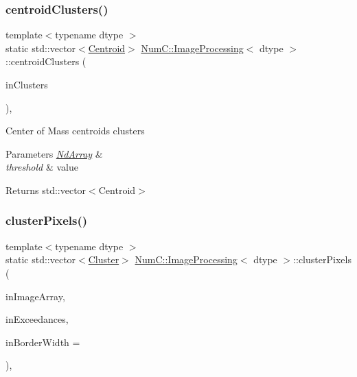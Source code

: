 \subsubsection{\texorpdfstring{centroid\+Clusters()}{centroidClusters()}}
{\footnotesize\ttfamily template$<$typename dtype $>$ \\
static std\+::vector$<$\mbox{\hyperlink{class_num_c_1_1_image_processing_1_1_centroid}{Centroid}}$>$ \mbox{\hyperlink{class_num_c_1_1_image_processing}{Num\+C\+::\+Image\+Processing}}$<$ dtype $>$\+::centroid\+Clusters (\begin{DoxyParamCaption}\item[{const std\+::vector$<$ \mbox{\hyperlink{class_num_c_1_1_image_processing_1_1_cluster}{Cluster}} $>$ \&}]{in\+Clusters }\end{DoxyParamCaption})\hspace{0.3cm}{\ttfamily [inline]}, {\ttfamily [static]}}

Center of Mass centroids clusters


\begin{DoxyParams}{Parameters}
{\em \mbox{\hyperlink{class_num_c_1_1_nd_array}{Nd\+Array}}} & \\
\hline
{\em threshold} & value \\
\hline
\end{DoxyParams}
\begin{DoxyReturn}{Returns}
std\+::vector$<$\+Centroid$>$ 
\end{DoxyReturn}
\mbox{\label{class_num_c_1_1_image_processing_a5625fbfbf91275e8072e2239af85d8c8}} 
\subsubsection{\texorpdfstring{cluster\+Pixels()}{clusterPixels()}}
{\footnotesize\ttfamily template$<$typename dtype $>$ \\
static std\+::vector$<$\mbox{\hyperlink{class_num_c_1_1_image_processing_1_1_cluster}{Cluster}}$>$ \mbox{\hyperlink{class_num_c_1_1_image_processing}{Num\+C\+::\+Image\+Processing}}$<$ dtype $>$\+::cluster\+Pixels (\begin{DoxyParamCaption}\item[{const \mbox{\hyperlink{class_num_c_1_1_nd_array}{Nd\+Array}}$<$ dtype $>$ \&}]{in\+Image\+Array,  }\item[{const \mbox{\hyperlink{class_num_c_1_1_nd_array}{Nd\+Array}}$<$ bool $>$ \&}]{in\+Exceedances,  }\item[{\mbox{\hyperlink{namespace_num_c_a60b2e2f49e1ff61059731c154e560869}{uint8}}}]{in\+Border\+Width = {} }\end{DoxyParamCaption})\hspace{0.3cm}{\ttfamily [inline]}, {\ttfamily [static]}}

